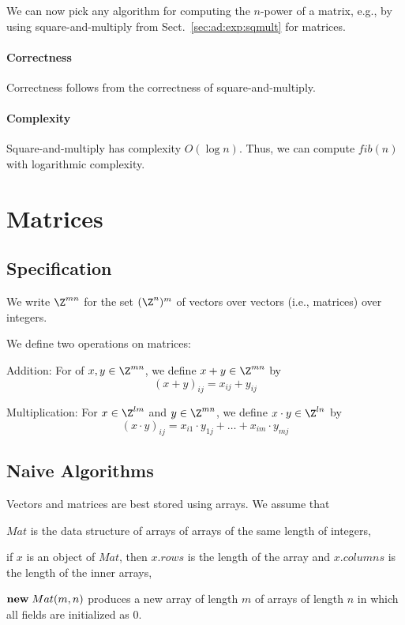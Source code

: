 We can now pick any algorithm for computing the $n$-power of a matrix, e.g., by using square-and-multiply from Sect.~\ref{sec:ad:exp:sqmult} for matrices.

\paragraph{Correctness}
Correctness follows from the correctness of square-and-multiply.

\paragraph{Complexity}
Square-and-multiply has complexity $O(\log n)$.
Thus, we can compute $fib(n)$ with logarithmic complexity.



\section{Matrices}\label{sec:ad:matrix}

\subsection{Specification}

We write $\Z^{mn}$ for the set $(\Z^n)^m$ of vectors over vectors (i.e., matrices) over integers.

We define two operations on matrices:
\begin{compactitem}
\item Addition: For of $x,y\in \Z^{mn}$, we define $x+y\in\Z^{mn}$ by
\[(x+y)_{ij}=x_{ij}+y_{ij}\]

\item Multiplication: For $x\in \Z^{lm}$ and $y\in \Z^{mn}$, we define $x\cdot y\in\Z^{ln}$ by
\[(x\cdot y)_{ij}=x_{i1}\cdot y_{1j} +\ldots +x_{im}\cdot y_{mj}\]
\end{compactitem}


\subsection{Naive Algorithms}

Vectors and matrices are best stored using arrays.
We assume that
\begin{compactitem}
 \item $Mat$ is the data structure of arrays of arrays of the same length of integers,
 \item if $x$ is an object of $Mat$, then $x.rows$ is the length of the array and $x.columns$ is the length of the inner arrays,
 \item ${\rm \bf new}\; Mat(m,n)$ produces a new array of length $m$ of arrays of length $n$ in which all fields are initialized as $0$.
\end{compactitem}

